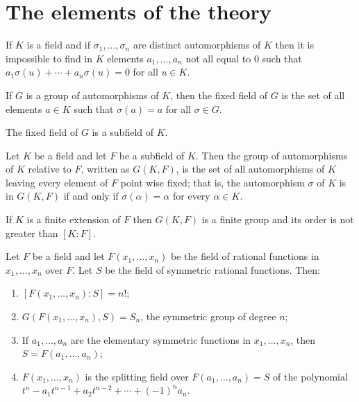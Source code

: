 \section{The elements of the theory}\label{sec:the_elements_of_the_theory}

\begin{theorem}\label{thm:distinct-field-automorphisms-are-linearly-independent}
	If $K$ is a field and if $\sigma_{1},\ldots,\sigma_{n}$ are distinct automorphisms of $K$ then it is impossible to find in $K$ elements $a_{1},\ldots,a_{n}$ not all equal to $0$ such that $a_{1}\sigma(u)+\cdots+a_{n}\sigma(u)=0$ for all ${u}\in{K}$.
\end{theorem}

\begin{definition}\label{def:fixed-field}
	If $G$ is a group of automorphisms of $K$, then the fixed field of $G$ is the set of all elements ${a}\in{K}$ such that $\sigma(a)=a$ for all ${\sigma}\in{G}$.
\end{definition}

\begin{lemma}\label{lem:the-fixed-field-is-in-fact-a-subfield}
	The fixed field of $G$ is a subfield of $K$.
\end{lemma}

\begin{definition}\label{def:automorphism-group-relative-to-a-subfield}
	Let $K$ be a field and let $F$ be a subfield of $K$. Then the group of automorphisms of $K$ relative to $F$, written as $G(K,F)$, is the set of all automorphisms of $K$ leaving every element of $F$ point wise fixed; that is, the automorphism $\sigma$ of $K$ is in $G(K,F)$ if and only if $\sigma(\alpha)=\alpha$ for every ${\alpha}\in{K}$.
\end{definition}

\begin{theorem}\label{thm:finite-extensions-make-a-finite-relative-automorphism-group}
	If $K$ is a finite extension of $F$ then $G(K,F)$ is a finite group and its order is not greater than $[K:F]$.
\end{theorem}

\begin{theorem}\label{thm:symmetric-rational-functions}
	Let $F$ be a field and let $F(x_{1},\ldots,x_{n})$ be the field of rational functions in $x_{1},\ldots,x_{n}$ over $F$. Let $S$ be the field of symmetric rational functions. Then:
	\begin{enumerate}
		\item $[F(x_{1},\ldots,x_{n}):S]=n!$;
		\item $G(F(x_{1},\ldots,x_{n}),S)=S_{n}$, the symmetric group of degree $n$;
		\item If $a_{1},\ldots,a_{n}$ are the elementary symmetric functions in $x_{1},\ldots,x_{n}$, then $S=F(a_{1},\ldots,a_{n})$;
		\item $F(x_{1},\ldots,x_{n})$ is the splitting field over $F(a_{1},\ldots,a_{n})=S$ of the polynomial $t^{n}-a_{1}t^{n-1}+a_{2}t^{n-2}+\cdots+(-1)^{n}a_{n}$.
	\end{enumerate}
\end{theorem}

